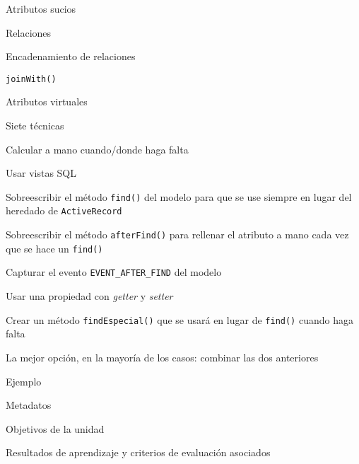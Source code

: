 \begin{longenum}
\begin{longenum}
\begin{longenum}
\begin{longenum}
            \end{longenum}
            \item Atributos sucios
            \item Relaciones
            \begin{longenum}
                \item Encadenamiento de relaciones
            \end{longenum}
            \item \texttt{joinWith()}
            \item Atributos virtuales
            \begin{longenum}
                \item Siete técnicas
                \begin{longenum}
                    \item Calcular a mano cuando/donde haga falta
                    \item Usar vistas SQL
                    \item Sobreescribir el método \texttt{find()} del modelo para que se use siempre en lugar del heredado de \texttt{ActiveRecord}
                    \item Sobreescribir el método \texttt{afterFind()} para rellenar el atributo a mano cada vez que se hace un \texttt{find()}
                    \item Capturar el evento \texttt{EVENT\_AFTER\_FIND} del modelo
                    \item Usar una propiedad con \textit{getter} y \textit{setter}
                    \item Crear un método \texttt{findEspecial()} que se usará en lugar de \texttt{find()} cuando haga falta
                    \item La mejor opción, en la mayoría de los casos: combinar las dos anteriores
                    \begin{longenum}
                        \item Ejemplo
                    \end{longenum}
                \end{longenum}
            \end{longenum}
        \end{longenum}
        \item Metadatos
        \begin{longenum}
            \item Objetivos de la unidad
            \item Resultados de aprendizaje y criterios de evaluación asociados

\end{longenum}
\end{longenum}
\end{longenum}
